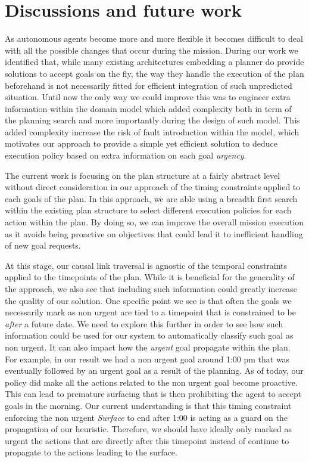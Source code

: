 \section{Discussions and future work}
\label{sec:conclude}

As autonomous agents become more and more flexible it becomes difficult
to deal with all the possible changes that occur during the
mission. During our work we identified that, while many existing 
architectures embedding a planner do provide solutions to accept goals
on the fly, the way they handle the execution of the plan beforehand
is not necessarily fitted for efficient integration of such unpredicted
situation. Until now the only way we could improve this was to engineer
extra information within the domain model which added complexity both in
term of the planning search and more importantly during the design of
such model. This added complexity increase the risk of fault
introduction within the model, which motivates our approach to provide 
a simple yet efficient solution to deduce execution policy based
on extra information on each goal {\em urgency}.

The current work is focusing on the plan structure at a fairly
abstract level without direct consideration in our approach of the
timing constraints applied to each goals of the plan. In this approach,
we are able using a breadth first search within the existing plan
structure to select different execution policies for each action
within the plan. By doing so, we can improve the overall mission 
execution as it avoids being proactive on objectives that could lead it
to inefficient handling of new goal requests.

At this stage, our causal link traversal is agnostic of the temporal 
constraints applied to the timepoints of the plan. While it is
beneficial for the generality of the approach, we also see that
including such information could greatly increase the quality of our solution. 
One specific point we see is that often the goals we necessarily mark
as non urgent are tied to a timepoint that is constrained to be {\em
  after} a future date. We need to explore this further in order to
see how such information could be used for our system to automatically
classify such goal as non urgent. It can also impact how the
{\em urgent} goal propagate within the plan. For example, in our result
we had a non urgent goal around 1:00 pm that was eventually 
followed by an urgent goal as a result of the planning. As of today, 
our policy did make all the actions related to the non urgent goal 
become proactive. This can lead to premature surfacing that is then 
prohibiting the agent to accept goals in the morning. Our current
understanding is that this timing constraint enforcing the non
urgent {\em Surface} to end after 1:00 is acting as a guard on the
propagation of our heuristic. Therefore, we should have ideally only
marked as urgent the actions that are directly after this timepoint
instead of continue to propagate to the actions leading to the
surface. 

